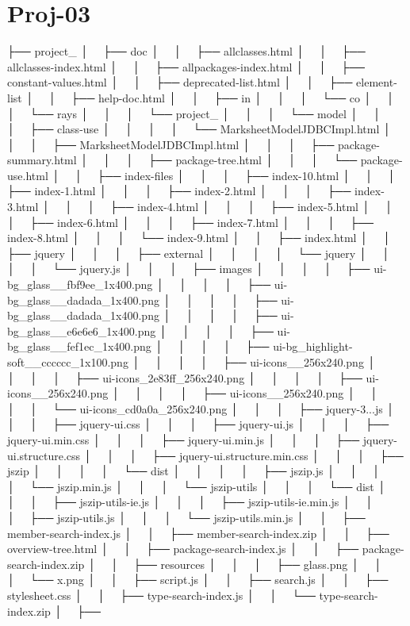 \chapter{Proj-\/03}
\hypertarget{md_README}{}\label{md_README}
\label{md_README_autotoc_md0}%
%
├── project\+\_ │   ├── doc │   │   ├── allclasses.\+html │   │   ├── allclasses-\/index.\+html │   │   ├── allpackages-\/index.\+html │   │   ├── constant-\/values.\+html │   │   ├── deprecated-\/list.\+html │   │   ├── element-\/list │   │   ├── help-\/doc.\+html │   │   ├── in │   │   │   └── co │   │   │   └── rays │   │   │   └── project\+\_ │   │   │   └── model │   │   │   ├── class-\/use │   │   │   │   └── Marksheet\+Model\+JDBCImpl.\+html │   │   │   ├── Marksheet\+Model\+JDBCImpl.\+html │   │   │   ├── package-\/summary.\+html │   │   │   ├── package-\/tree.\+html │   │   │   └── package-\/use.\+html │   │   ├── index-\/files │   │   │   ├── index-\/10.\+html │   │   │   ├── index-\/1.\+html │   │   │   ├── index-\/2.\+html │   │   │   ├── index-\/3.\+html │   │   │   ├── index-\/4.\+html │   │   │   ├── index-\/5.\+html │   │   │   ├── index-\/6.\+html │   │   │   ├── index-\/7.\+html │   │   │   ├── index-\/8.\+html │   │   │   └── index-\/9.\+html │   │   ├── index.\+html │   │   ├── jquery │   │   │   ├── external │   │   │   │   └── jquery │   │   │   │   └── jquery.\+js │   │   │   ├── images │   │   │   │   ├── ui-\/bg\+\_\+glass\+\_\+\_\+fbf9ee\+\_\+1x400.\+png │   │   │   │   ├── ui-\/bg\+\_\+glass\+\_\+\_\+dadada\+\_\+1x400.\+png │   │   │   │   ├── ui-\/bg\+\_\+glass\+\_\+\_\+dadada\+\_\+1x400.\+png │   │   │   │   ├── ui-\/bg\+\_\+glass\+\_\+\_\+e6e6e6\+\_\+1x400.\+png │   │   │   │   ├── ui-\/bg\+\_\+glass\+\_\+\_\+fef1ec\+\_\+1x400.\+png │   │   │   │   ├── ui-\/bg\+\_\+highlight-\/soft\+\_\+\_\+cccccc\+\_\+1x100.\+png │   │   │   │   ├── ui-\/icons\+\_\+\_\+256x240.\+png │   │   │   │   ├── ui-\/icons\+\_\+2e83ff\+\_\+256x240.\+png │   │   │   │   ├── ui-\/icons\+\_\+\_\+256x240.\+png │   │   │   │   ├── ui-\/icons\+\_\+\_\+256x240.\+png │   │   │   │   └── ui-\/icons\+\_\+cd0a0a\+\_\+256x240.\+png │   │   │   ├── jquery-\/3...\+js │   │   │   ├── jquery-\/ui.\+css │   │   │   ├── jquery-\/ui.\+js │   │   │   ├── jquery-\/ui.\+min.\+css │   │   │   ├── jquery-\/ui.\+min.\+js │   │   │   ├── jquery-\/ui.\+structure.\+css │   │   │   ├── jquery-\/ui.\+structure.\+min.\+css │   │   │   ├── jszip │   │   │   │   └── dist │   │   │   │   ├── jszip.\+js │   │   │   │   └── jszip.\+min.\+js │   │   │   └── jszip-\/utils │   │   │   └── dist │   │   │   ├── jszip-\/utils-\/ie.\+js │   │   │   ├── jszip-\/utils-\/ie.\+min.\+js │   │   │   ├── jszip-\/utils.\+js │   │   │   └── jszip-\/utils.\+min.\+js │   │   ├── member-\/search-\/index.\+js │   │   ├── member-\/search-\/index.\+zip │   │   ├── overview-\/tree.\+html │   │   ├── package-\/search-\/index.\+js │   │   ├── package-\/search-\/index.\+zip │   │   ├── resources │   │   │   ├── glass.\+png │   │   │   └── x.\+png │   │   ├── script.\+js │   │   ├── search.\+js │   │   ├── stylesheet.\+css │   │   ├── type-\/search-\/index.\+js │   │   └── type-\/search-\/index.\+zip │   ├── 